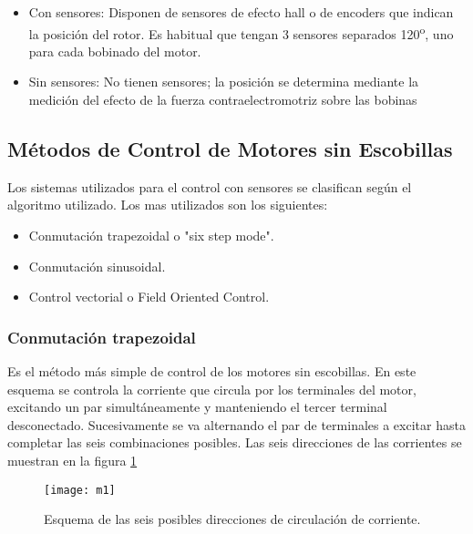 \begin{itemize}
  \item Con sensores: Disponen de sensores de efecto hall o de encoders que indican la posición del rotor. Es habitual que tengan 3 sensores separados 120\textsuperscript{o}, uno para cada bobinado del motor.
  \item Sin sensores: No tienen sensores; la posición se determina mediante la medición del efecto de la fuerza contraelectromotriz sobre las bobinas
\end{itemize}






\subsection{Métodos de Control de Motores sin Escobillas}
\label{subsection: metodos_control_motores}

Los sistemas utilizados para el control con sensores se clasifican según el algoritmo utilizado. Los mas utilizados son los siguientes: 

\begin{itemize}
\item Conmutación trapezoidal o "six step mode".
\item Conmutación sinusoidal.
\item Control vectorial o Field Oriented Control.
\end{itemize}

\subsubsection{Conmutación trapezoidal}
\label{conmutacion_trapezoidal}

Es el método más simple de control de los motores sin escobillas. En este esquema se controla la corriente que circula por los terminales del motor, excitando un par simultáneamente y manteniendo el tercer terminal desconectado. Sucesivamente se va alternando el par de terminales a excitar hasta completar las seis combinaciones posibles. Las seis direcciones de las corrientes se muestran en la figura \ref{fig:trapezoidal}

\begin{figure}[h]
  \centering
  \texttt{[image: m1]}
  \caption{Esquema de las seis posibles direcciones de circulación de corriente.}\label{fig:trapezoidal}
\end{figure}


